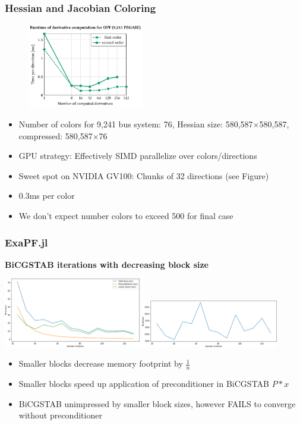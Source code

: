 \begin{frame}
  \frametitle{Hessian and Jacobian Coloring}
  \begin{center}
    \begin{figure}
      \includegraphics[width=0.45\textwidth]{figures/directionsgpu}
    \end{figure}
  \end{center}
  \begin{itemize}
    \item Number of colors for 9,241 bus system: 76, Hessian size: 580,587$\times$580,587, compressed: 580,587$\times$76
    \item GPU strategy: Effectively SIMD parallelize over colors/directions
    \item Sweet spot on NVIDIA GV100: Chunks of 32 directions (see Figure)
    \item 0.3ms per color
    \item We don’t expect number colors to exceed 500 for final case
  \end{itemize}
\end{frame}

\begin{frame}[fragile]
  \frametitle{ExaPF.jl}
  {\bf BiCGSTAB iterations with decreasing block size}
  \begin{center}
   \includegraphics[width=0.45\textwidth]{figures/blocks}
   \includegraphics[width=0.45\textwidth]{figures/bicgstabiter}
  \end{center}
  \begin{itemize}
    \item Smaller blocks decrease memory footprint by $\frac{1}{n}$ 
    \item Smaller blocks speed up application of preconditioner in BiCGSTAB $P * x$
    \item BiCGSTAB unimpressed by smaller block sizes, however FAILS to converge without preconditioner
  \end{itemize}
\end{frame}

